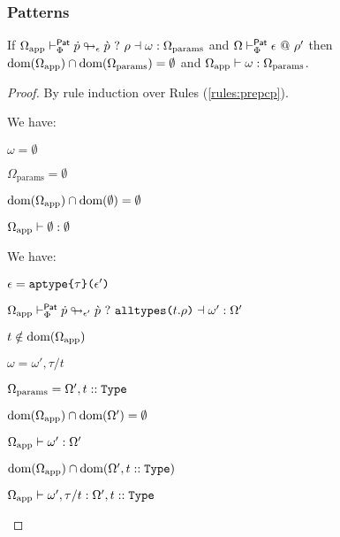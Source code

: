 \subsubsection{Patterns}
\begin{lemma}
\label{lemma:pattern-deparameterization-P}
If $\Omega_\text{app} \vdash_{\Phi}^\mathsf{Pat} \dot{p} \looparrowright_{\epsilon} \grave{p} ~?~ \rho \dashv \omega : \Omega_\text{params}$ and $\Omega \vdash_{\Phi}^{\mathsf{Pat}} \epsilon ~@~ \rho'$ then $\text{dom}(\Omega_\text{app}) \cap \text{dom}(\Omega_\text{params}) = \emptyset$ and $\Omega_\text{app} \vdash \omega : \Omega_\text{params}$.
\end{lemma}
\begin{proof} By rule induction over Rules (\ref{rules:prepcp}).
\begin{byCases}
  \item[\text{(\ref{rule:prepcp-cepat})}] We have:
    \begin{pfsteps*}
      \item $\omega=\emptyset$ 
      \item $\Omega_\text{params}=\emptyset$ 
      \item $\text{dom}(\Omega_\text{app}) \cap \text{dom}(\emptyset) = \emptyset$ 
      \item $\Omega_\text{app} \vdash \emptyset : \emptyset$ 
    \end{pfsteps*}
    \resetpfcounter
  \item[\text{(\ref{rule:prepcp-allmods})}] We have:
    \begin{pfsteps*}
      \item $\epsilon=\texttt{aptype}\texttt{\{}\tau\texttt{\}(}\epsilon'\texttt{)}$ 
      \item $\Omega_\text{app} \vdash_{\Phi}^\mathsf{Pat} \dot{p} \looparrowright_{\epsilon'} \grave{p} ~?~ \texttt{alltypes}\texttt{(}t.\rho\texttt{)} \dashv \omega' : \Omega'$  
      \item $t \notin \text{dom}(\Omega_\text{app})$  
      \item $\omega=\omega', \tau/t$ 
      \item $\Omega_\text{params} = \Omega', t :: \texttt{Type}$ 
      \item $\text{dom}(\Omega_\text{app}) \cap \text{dom}(\Omega') = \emptyset$  
      \item $\Omega_\text{app} \vdash \omega' : \Omega'$  
      \item $\text{dom}(\Omega_\text{app}) \cap \text{dom}(\Omega', t :: \texttt{Type})$ 
      \item $\Omega_\text{app} \vdash \omega', \tau/t : \Omega', t :: \texttt{Type}$ 
    \end{pfsteps*}
    \resetpfcounter
\end{byCases}
\end{proof}

